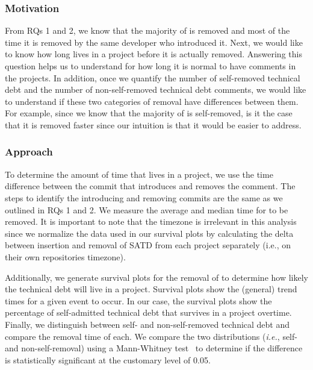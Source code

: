 \subsubsection*{Motivation} From RQs 1 and 2, we know that the majority of \SATD is removed and most of the time it is removed by the same developer who introduced it. Next, we would like to know how long \SATD lives in a project before it is actually removed. Answering this question helps us to understand for how long it is normal to have \SATD comments in the projects. In addition, once we quantify the number of self-removed technical debt and the number of non-self-removed technical debt comments, we would like to understand if these two categories of removal have differences between them. For example, since we know that the majority of \SATD is self-removed, is it the case that it is removed faster since our intuition is that it would be easier to address. 

\subsubsection*{Approach} To determine the amount of time that \SATD lives in a project, we use the time difference between the commit that introduces and removes the \SATD comment. The steps to identify the \SATD introducing and removing commits are the same as we outlined in RQs 1 and 2. We measure the average and median time for \SATD to be removed. It is important to note that the timezone is irrelevant in this analysis since we normalize the data used in our survival plots by calculating the delta between insertion and removal of SATD from each project separately (i.e., on their own repositories timezone).

Additionally, we generate survival plots for the removal of \SATD to determine how likely the technical debt will live in a project. Survival plots show the (general) trend times for a given event to occur. In our case, the survival plots show the  percentage of self-admitted technical debt that survives in a project overtime. Finally, we distinguish between self- and non-self-removed technical debt and compare the removal time of each. We compare the two distributions (\emph{i.e.}, self- and non-self-removal) using a Mann-Whitney test~\cite{mann1947test} to determine if the difference is statistically significant at the customary level of 0.05.

